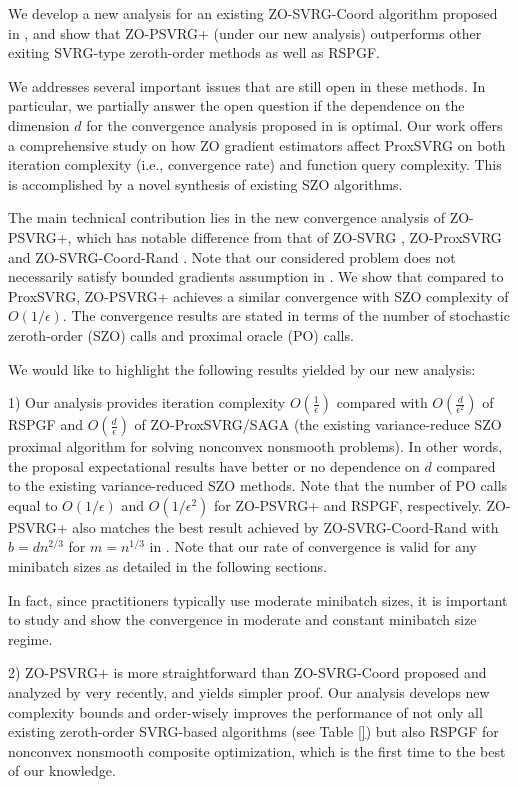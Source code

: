 \documentclass{article}
\theoremstyle{definition}
\theoremstyle{remark}
\begin{document}
{\color{Green}

{\color{YellowOrange}
We develop a new analysis for an existing ZO-SVRG-Coord algorithm proposed in \cite{liu2018zeroth,ji2019improved}, and
show that ZO-PSVRG+ (under our new analysis) outperforms other exiting SVRG-type zeroth-order methods as well as RSPGF.
} 
{\color{Brown}
We addresses several important issues that are still open in these methods. In particular, we partially answer the open question if the dependence on the dimension $d$ for the convergence analysis proposed in \cite{liu2018zeroth} is optimal. Our work offers a comprehensive study on how ZO gradient estimators affect ProxSVRG on both iteration complexity (i.e., convergence rate) and function query complexity. This
is accomplished by a novel synthesis of existing SZO algorithms.

 
} 
{\color{Violet}
The main technical contribution lies in the new convergence analysis of ZO-PSVRG+,
which has notable difference from that of ZO-SVRG \cite{liu2018zeroth}, ZO-ProxSVRG \cite{huang2019faster} and ZO-SVRG-Coord-Rand \cite{ji2019improved}. {\color{Brown} Note that our considered problem does not necessarily satisfy bounded gradients assumption in \cite{ghadimi2016accelerated,huang2019faster}.}
We show that compared to
ProxSVRG, ZO-PSVRG+ achieves a similar convergence with SZO complexity of $O(1/\epsilon)$.
The convergence results are stated in terms of the number of stochastic zeroth-order (SZO) calls and proximal oracle (PO) calls. 
} 
 

{\color{Violet}
We would like to highlight the following results yielded by our new analysis:

1) Our analysis provides iteration complexity $O(\frac{1}{{\epsilon}})$ compared with $O(\frac{d}{\epsilon^2})$ of RSPGF \cite{ghadimi2016accelerated}  and $O(\frac{d}{\epsilon})$ of ZO-ProxSVRG/SAGA  \cite{huang2019faster} (the existing variance-reduce SZO proximal algorithm for solving nonconvex nonsmooth problems).  
{\color{RubineRed}In other words, the proposal expectational results have better or no dependence on
$d$ compared to the existing variance-reduced SZO methods.} Note that the number of PO calls equal to $O(1/\epsilon)$  and $O(1/\epsilon^2)$ for ZO-PSVRG+ and RSPGF, respectively.  ZO-PSVRG+ also matches the best result achieved by ZO-SVRG-Coord-Rand with $b = d n^{2/3}$ for $m = n^{1/3}$ in \cite{ji2019improved}. Note that our rate of convergence is valid for any minibatch sizes as detailed in the following sections.  
} In fact, since practitioners typically use moderate minibatch sizes, it is important to study and show the convergence in moderate and constant minibatch size regime.


{\color{Violet} 2) ZO-PSVRG+ is more straightforward than ZO-SVRG-Coord proposed and analyzed by \cite{liu2018zeroth,ji2019improved} very recently, and yields simpler proof.  
}{\color{YellowOrange}
Our analysis develops new complexity bounds and order-wisely improves the performance of not only all existing zeroth-order SVRG-based algorithms
(see Table \ref{}) but also RSPGF for nonconvex nonsmooth composite optimization, which is the first time to the best of our knowledge. 
}



}
\end{document}
